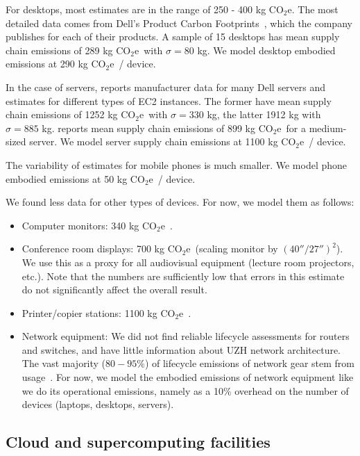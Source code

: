 \documentclass[11pt]{article}
\newcommand{\coe}{CO$_2$e}
\newcommand{\gcoe}{g \coe}
\newcommand{\kgcoe}{k\gcoe}
\begin{document}
For desktops, most estimates are in the range of 250 - 400 \kgcoe. The most detailed data comes from Dell's Product Carbon Footprints~\cite{dellpcf}, which the company publishes for each of their products. A sample of 15 desktops has mean supply chain emissions of 289 \kgcoe\ with $\sigma = 80$ kg. We model desktop embodied emissions at 290 \kgcoe\ / device.

In the case of servers, \textcite{davy2021} reports manufacturer data for many Dell servers and estimates for different types of EC2 instances. The former have mean supply chain emissions of 1252 \kgcoe\ with $\sigma = 330$ kg, the latter 1912 kg with $\sigma = 885$ kg. \textcite{boavizta:api} reports mean supply chain emissions of 899 \kgcoe\ for a medium-sized server. We model server supply chain emissions at 1100 \kgcoe\ / device.

The variability of estimates for mobile phones is much smaller. We model phone embodied emissions at 50 \kgcoe\ / device.

We found less data for other types of devices. For now, we model them as follows:

\begin{itemize}
  \item Computer monitors: 340 \kgcoe~\cite{dellpcf,lovehagen2023,teehan2013}.
  \item Conference room displays: 700 \kgcoe\ (scaling monitor by $(40''/27'')^2$). We use this as a proxy for all audiovisual equipment (lecture room projectors, etc.). Note that the numbers are sufficiently low that errors in this estimate do not significantly affect the overall result.
  \item Printer/copier stations: 1100 \kgcoe~\cite{ecoinvent}.
  \item Network equipment: We did not find reliable lifecycle assessments for routers and switches, and have little information about UZH network architecture. The vast majority ($80-95\%$) of lifecycle emissions of network gear stem from usage~\cite{cisco2024,jacob2023}. For now, we model the embodied emissions of network equipment like we do its operational emissions, namely as a 10\% overhead on the number of devices (laptops, desktops, servers).
\end{itemize}

\subsection{Cloud and supercomputing facilities}
\end{document}
